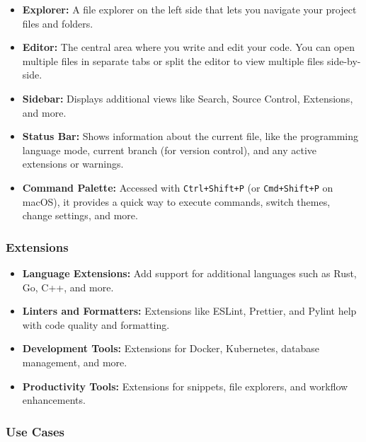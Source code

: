 \documentclass[
  letterpaper,
  DIV=11,
  numbers=noendperiod]{scrreprt}
\providecommand{\tightlist}{%
  \setlength{\itemsep}{0pt}\setlength{\parskip}{0pt}}\usepackage{longtable,booktabs,array}
\begin{document}
\begin{itemize}
\tightlist
\item
  \textbf{Explorer:} A file explorer on the left side that lets you
  navigate your project files and folders.
\item
  \textbf{Editor:} The central area where you write and edit your code.
  You can open multiple files in separate tabs or split the editor to
  view multiple files side-by-side.
\item
  \textbf{Sidebar:} Displays additional views like Search, Source
  Control, Extensions, and more.
\item
  \textbf{Status Bar:} Shows information about the current file, like
  the programming language mode, current branch (for version control),
  and any active extensions or warnings.
\item
  \textbf{Command Palette:} Accessed with \texttt{Ctrl+Shift+P} (or
  \texttt{Cmd+Shift+P} on macOS), it provides a quick way to execute
  commands, switch themes, change settings, and more.
\end{itemize}

\hypertarget{extensions}{%
\subsubsection{Extensions}\label{extensions}}

\begin{itemize}
\tightlist
\item
  \textbf{Language Extensions:} Add support for additional languages
  such as Rust, Go, C++, and more.
\item
  \textbf{Linters and Formatters:} Extensions like ESLint, Prettier, and
  Pylint help with code quality and formatting.
\item
  \textbf{Development Tools:} Extensions for Docker, Kubernetes,
  database management, and more.
\item
  \textbf{Productivity Tools:} Extensions for snippets, file explorers,
  and workflow enhancements.
\end{itemize}

\hypertarget{use-cases}{%
\subsubsection{Use Cases}\label{use-cases}}
\end{document}
